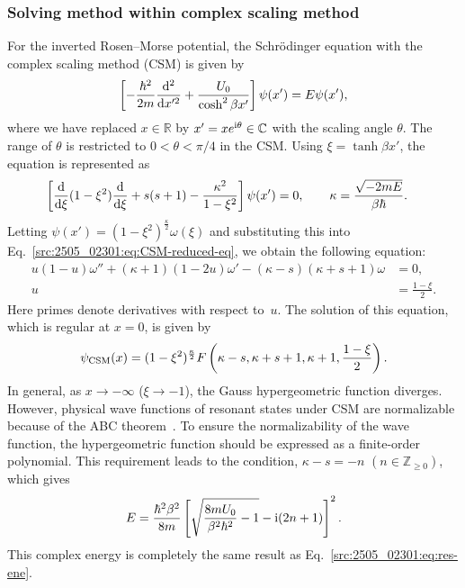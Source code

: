 \subsubsection{Solving method within complex scaling method}
For the inverted Rosen–Morse potential, the Schr\"{o}dinger equation with the complex scaling method (CSM) is given by
\begin{align}
    \left[-\frac{\hbar^2}{2m} \frac{\mathrm{d}^2}{\mathrm{d} x'^2} + \frac{U_{0}}{\cosh^2 \beta x'}\right] \psi(x')
    = E \psi(x') ,
\end{align}
where we have replaced $x\in\mathbb{R}$ by $x'=xe^{\mathrm{i} \theta}\in\mathbb{C}$ with the scaling angle $\theta$. The range of $\theta$ is restricted to $0<\theta<\pi/4$ in the CSM. Using $\xi=\tanh\beta x'$, the equation is represented as
\begin{align}
    \left[ \frac{\mathrm{d}}{\mathrm{d} \xi} (1-\xi^2)\frac{\mathrm{d}}{\mathrm{d} \xi} +s(s+1) - \frac{\kappa^2}{1-\xi^2} \right] \psi(x')
    &= 0 , \qquad
    \kappa = \frac{\sqrt{-2mE}}{\beta\hbar} .
    \label{src:2505_02301:eq:CSM-reduced-eq}
\end{align}
Letting $\psi(x')=(1-\xi^2)^{\frac{\kappa}{2}}\omega(\xi)$ and substituting this into Eq.~\eqref{src:2505_02301:eq:CSM-reduced-eq}, we obtain the following equation:
\begin{align}
    u(1-u)\omega''+(\kappa+1)(1-2u)\omega'
    -(\kappa-s)(\kappa+s+1)\omega&=0,
    \\
    u&=\frac{1-\xi}{2}.
\end{align}
Here primes denote derivatives with respect to~$u$.
The solution of this equation, which is regular at $x=0$, is given by
\begin{align}
    \psi_{\mathrm{CSM}}(x)= (1-\xi^2)^{\frac{\kappa}{2}} 
    F\left( \kappa-s, \kappa+s+1, \kappa+1, \frac{1-\xi}{2} \right).
\end{align}
In general, as $x\to-\infty$ ($\xi\to-1$), the Gauss hypergeometric function diverges. However, physical wave functions of resonant states under CSM are normalizable because of the ABC theorem~\cite{Aguilar:1971ve,Balslev:1971vb}. To ensure the normalizability of the wave function, the hypergeometric function should be expressed as a finite-order polynomial. This requirement leads to the condition, $\kappa-s=-n$ $(n\in\mathbb{Z}_{\geq0})$, which gives
\begin{align}
    E = \frac{\hbar^2\beta^2}{8m} \left[\sqrt{\frac{8mU_0}{\beta^2 \hbar^2} - 1} - \mathrm{i} (2n + 1) \right]^2.
\end{align}
This complex energy is completely the same result as Eq.~\eqref{src:2505_02301:eq:res-ene}.
